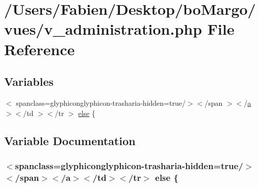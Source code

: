 \hypertarget{v__administration_8php}{}\section{/\+Users/\+Fabien/\+Desktop/bo\+Margo/vues/v\+\_\+administration.php File Reference}
\label{v__administration_8php}
\subsection*{Variables}
\begin{DoxyCompactItemize}
\item 
$<$ spanclass=\textquotesingle{}glyphiconglyphicon-\/trash\textquotesingle{}aria-\/hidden=\textquotesingle{}true\textquotesingle{}/$>$$<$/span $>$$<$/\hyperlink{bootstrap_8min_8js_a1f5870dcf487187f13d5fd328ed9e6e7}{a} $>$$<$/td $>$$<$/tr $>$ \hyperlink{v__administration_8php_a44599bded002aad346cab6a34c8e250d}{else} \{
\end{DoxyCompactItemize}


\subsection{Variable Documentation}
\hypertarget{v__administration_8php_a44599bded002aad346cab6a34c8e250d}{}
\subsubsection[{else}]{\setlength{\rightskip}{0pt plus 5cm}$<$spanclass=\textquotesingle{}glyphiconglyphicon-\/trash\textquotesingle{}aria-\/hidden=\textquotesingle{}true\textquotesingle{}/$>$$<$/span$>$$<$/{\bf a}$>$$<$/td$>$$<$/tr$>$ else \{}\label{v__administration_8php_a44599bded002aad346cab6a34c8e250d}
